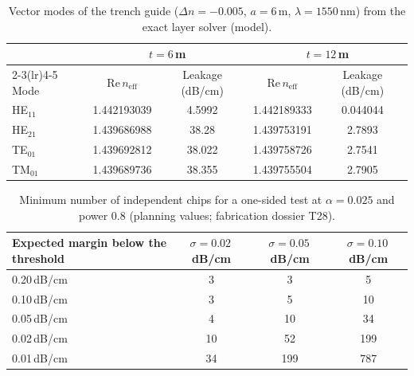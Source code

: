 \documentclass[11pt,a4paper]{article}
\newcommand{\dBcm}{\,dB/cm\xspace}
\newcommand{\um}{\,\textmu m\xspace}
\begin{document}
\begin{table}[htbp]
\centering\small
\caption{Vector modes of the trench guide ($\Delta n=-0.005$, $a=6$\um, $\lambda=1550$\,nm) from the exact layer solver (model).}
\label{tab:vector}
\begin{tabular}{@{}lcccc@{}}
\toprule
 & \multicolumn{2}{c}{$t=6$\um} & \multicolumn{2}{c}{$t=12$\um} \\
\cmidrule(lr){2-3}\cmidrule(lr){4-5}
Mode & Re\,$n_\mathrm{eff}$ & Leakage (dB/cm) & Re\,$n_\mathrm{eff}$ & Leakage (dB/cm) \\
\midrule
HE$_{11}$ & 1.442193039 & 4.5992 & 1.442189333 & 0.044044 \\
HE$_{21}$ & 1.439686988 & 38.28 & 1.439753191 & 2.7893 \\
TE$_{01}$ & 1.439692812 & 38.022 & 1.439758726 & 2.7541 \\
TM$_{01}$ & 1.439689736 & 38.355 & 1.439755504 & 2.7905 \\
\bottomrule
\end{tabular}
\end{table}

\begin{table}[htbp]
\centering\small
\caption{Minimum number of independent chips for a one-sided test at $\alpha=0.025$ and power 0.8 (planning values; fabrication dossier T28).}
\label{tab:samplesize}
\begin{tabular}{@{}lccc@{}}
\toprule
Expected margin below the threshold & $\sigma=0.02$\dBcm & $\sigma=0.05$\dBcm & $\sigma=0.10$\dBcm \\
\midrule
0.20\dBcm & 3 & 3 & 5 \\
0.10\dBcm & 3 & 5 & 10 \\
0.05\dBcm & 4 & 10 & 34 \\
0.02\dBcm & 10 & 52 & 199 \\
0.01\dBcm & 34 & 199 & 787 \\
\bottomrule
\end{tabular}
\end{table}
\end{document}
